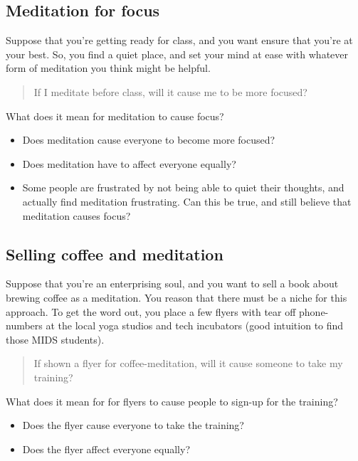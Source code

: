 \documentclass[
]{book}
\providecommand{\tightlist}{%
  \setlength{\itemsep}{0pt}\setlength{\parskip}{0pt}}
\begin{document}
\hypertarget{meditation-for-focus}{%
\subsection{Meditation for focus}\label{meditation-for-focus}}

Suppose that you're getting ready for class, and you want ensure that
you're at your best. So, you find a quiet place, and set your mind at
ease with whatever form of meditation you think might be helpful.

\begin{quote}
If I meditate before class, will it cause me to be more focused?
\end{quote}

What does it mean for meditation to cause focus?

\begin{itemize}
\tightlist
\item
  Does meditation cause everyone to become more focused?
\item
  Does meditation have to affect everyone equally?
\item
  Some people are frustrated by not being able to quiet their thoughts,
  and actually find meditation frustrating. Can this be true, and still
  believe that meditation causes focus?
\end{itemize}

\hypertarget{selling-coffee-and-meditation}{%
\subsection{Selling coffee and
meditation}\label{selling-coffee-and-meditation}}

Suppose that you're an enterprising soul, and you want to sell a book
about brewing coffee as a meditation. You reason that there must be a
niche for this approach. To get the word out, you place a few flyers
with tear off phone-numbers at the local yoga studios and tech
incubators (good intuition to find those MIDS students).

\begin{quote}
If shown a flyer for coffee-meditation, will it cause someone to take my
training?
\end{quote}

What does it mean for for flyers to cause people to sign-up for the
training?

\begin{itemize}
\tightlist
\item
  Does the flyer cause everyone to take the training?
\item
  Does the flyer affect everyone equally?
\end{itemize}
\end{document}

